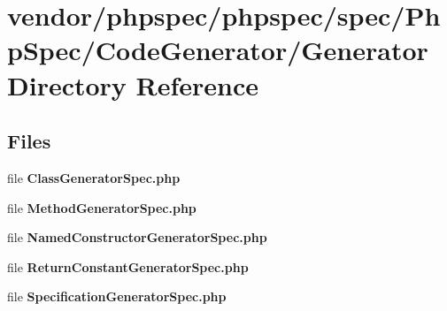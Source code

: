 \section{vendor/phpspec/phpspec/spec/\+Php\+Spec/\+Code\+Generator/\+Generator Directory Reference}
\label{dir_59809c968d902c299216b4ee4345bb44}
\subsection*{Files}
\begin{DoxyCompactItemize}
\item 
file {\bf Class\+Generator\+Spec.\+php}
\item 
file {\bf Method\+Generator\+Spec.\+php}
\item 
file {\bf Named\+Constructor\+Generator\+Spec.\+php}
\item 
file {\bf Return\+Constant\+Generator\+Spec.\+php}
\item 
file {\bf Specification\+Generator\+Spec.\+php}
\end{DoxyCompactItemize}
